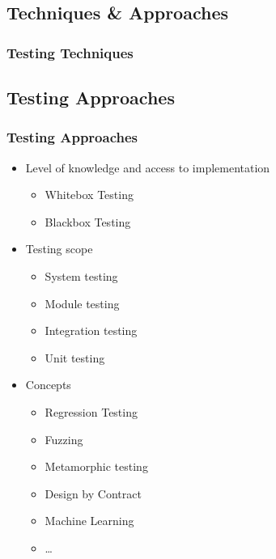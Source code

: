 
\subsection{Techniques \& Approaches}


\begin{frame}
\frametitle{Testing Techniques}
  \begin{center}
  \end{center}
\end{frame}


\subsection{Testing Approaches}


\begin{frame}[fragile]
\frametitle{Testing Approaches}

\begin{itemize}
\item<1-> Level of \alert<1>{knowledge} and \alert<1>{access} to implementation
\begin{itemize}
\item Whitebox Testing
\item Blackbox Testing
\end{itemize}
\end{itemize}

\begin{minipage}[t]{0.49\textwidth}
\begin{itemize}
\item<2-> \alert<2>{Testing scope}
\begin{itemize}
\item System testing
\item Module testing
\item Integration testing
\item Unit testing
\end{itemize}
\end{itemize}
\end{minipage}
%
\begin{minipage}[t]{0.49\textwidth}
\begin{itemize}
\item<3-> \alert<3>{Concepts}
\begin{itemize}
\item Regression Testing
\item Fuzzing
\item Metamorphic testing
\item Design by Contract
\item Machine Learning
\item \ldots
\end{itemize}
\end{itemize}
\end{minipage}

\end{frame}

